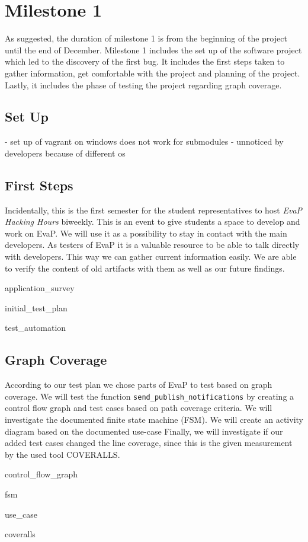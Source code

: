 \section{Milestone 1}
As suggested, the duration of milestone 1 is from the beginning of the project until the end of December.
Milestone 1 includes the set up of the software project which led to the discovery of the first bug.
It includes the first steps taken to gather information, get comfortable with the project and planning of the project.
Lastly, it includes the phase of testing the project regarding graph coverage.

\subsection{Set Up}
- set up of vagrant on windows does not work for submodules
- unnoticed by developers because of different os


\subsection{First Steps}
Incidentally, this is the first semester for the student representatives to host \emph{EvaP Hacking Hours} biweekly.
This is an event to give students a space to develop and work on EvaP.
We will use it as a possibility to stay in contact with the main developers.
As testers of EvaP it is a valuable resource to be able to talk directly with developers.
This way we can gather current information easily.
We are able to verify the content of old artifacts with them as well as our future findings.

{application_survey}

{initial_test_plan}

{test_automation}

\subsection{Graph Coverage}
According to our test plan we chose parts of EvaP to test based on graph coverage. 
We will test the function \texttt{send\_publish\_notifications} by creating a control flow graph and test cases based on path coverage criteria. 
We will investigate the documented finite state machine (FSM). 
We will create an activity diagram based on the documented use-case %
Finally, we will investigate if our added test cases changed the line coverage, since this is the given measurement by the used tool COVERALLS.

{control_flow_graph}

{fsm}

{use_case}

{coveralls}
